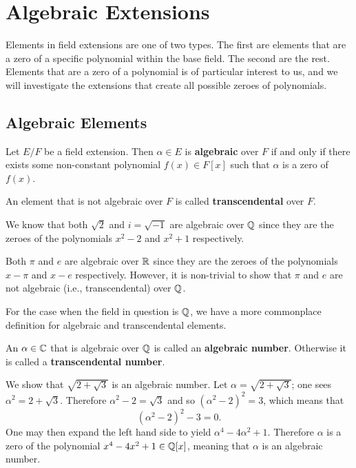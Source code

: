 \chapter{Algebraic Extensions}
Elements in field extensions are one of two types. The first are elements that are a zero of a specific polynomial within the base field. The second are the rest. Elements that are a zero of a polynomial is of particular interest to us, and we will investigate the extensions that create all possible zeroes of polynomials.

\section{Algebraic Elements}
\begin{definition}
    Let $E/F$ be a field extension. Then $\alpha \in E$ is \textbf{algebraic} over $F$ if and only if there exists some non-constant polynomial $f(x) \in F[x]$ such that $\alpha$ is a zero of $f(x)$.

    An element that is not algebraic over $F$ is called \textbf{transcendental} over $F$.
\end{definition}

\begin{example}
    We know that both $\sqrt2$ and $i = \sqrt{-1}$ are algebraic over $\mathbb{Q}$ since they are the zeroes of the polynomials $x^2 - 2$ and $x^2 + 1$ respectively.
\end{example}

\begin{example}
    Both $\pi$ and $e$ are algebraic over $\mathbb{R}$ since they are the zeroes of the polynomials $x - \pi$ and $x - e$ respectively. However, it is non-trivial to show that $\pi$ and $e$ are not algebraic (i.e., transcendental) over $\mathbb{Q}$.
\end{example}

For the case when the field in question is $\mathbb{Q}$, we have a more commonplace definition for algebraic and transcendental elements.

\begin{definition}
    An $\alpha \in \mathbb{C}$ that is algebraic over $\mathbb{Q}$ is called an \textbf{algebraic number}. Otherwise it is called a \textbf{transcendental number}.
\end{definition}

\begin{example}
    We show that $\sqrt{2+\sqrt3}$ is an algebraic number. Let $\alpha = \sqrt{2+\sqrt3}$; one sees $\alpha^2 = 2 + \sqrt3$. Therefore $\alpha^2 - 2 = \sqrt3$ and so $(\alpha^2 - 2)^2 = 3$, which means that
    \[
        (\alpha^2 - 2)^2 - 3 = 0.
    \]
    One may then expand the left hand side to yield $\alpha^4 - 4\alpha^2 + 1$. Therefore $\alpha$ is a zero of the polynomial $x^4 - 4x^2 + 1 \in \mathbb{Q}[x]$, meaning that $\alpha$ is an algebraic number.
\end{example}

